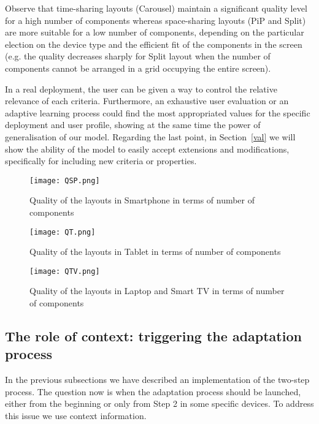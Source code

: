 Observe that time-sharing layouts (Carousel) maintain a significant quality level for a high number of components whereas space-sharing layouts (PiP and Split) are more suitable for a low number of components,
depending on the particular election on the device type and the efficient fit of the components in the screen (e.g. the quality decreases sharply for Split layout when the number of components cannot be arranged in a grid occupying the entire screen).

In a real deployment, the user can be given a way to control the relative relevance of each criteria.
Furthermore, an exhaustive user evaluation or an adaptive learning process could find the most appropriated values for the specific deployment and user profile, showing at the same time the power of generalisation of our model. 
Regarding the last point, in Section~\ref{val} we will show the ability of the model to easily accept extensions and modifications, specifically for including new criteria or properties. 

\begin{figure}
	\begin{center}
		\texttt{[image: QSP.png]}
		\caption{Quality of the layouts in Smartphone in terms of number of components}
		\label{fig:laygraphS}
	\end{center}
\end{figure}

\begin{figure}
	\begin{center}
		\texttt{[image: QT.png]}
		\caption{Quality of the layouts in Tablet in terms of number of components}
		\label{fig:laygraphT}
	\end{center}
\end{figure}

\begin{figure}
	\begin{center}
		\texttt{[image: QTV.png]}
		\caption{Quality of the layouts in Laptop and Smart TV in terms of number of components}
		\label{fig:laygraphLTV}
	\end{center}
\end{figure}

\subsection{The role of context: triggering the adaptation process}\label{ctx}

\label{Triggering}
In the previous subsections we have described an implementation of the two-step process. 
The question now is when the adaptation process should be launched, either from the beginning or only from Step 2 in some specific devices. 
To address this issue we use context information. 

